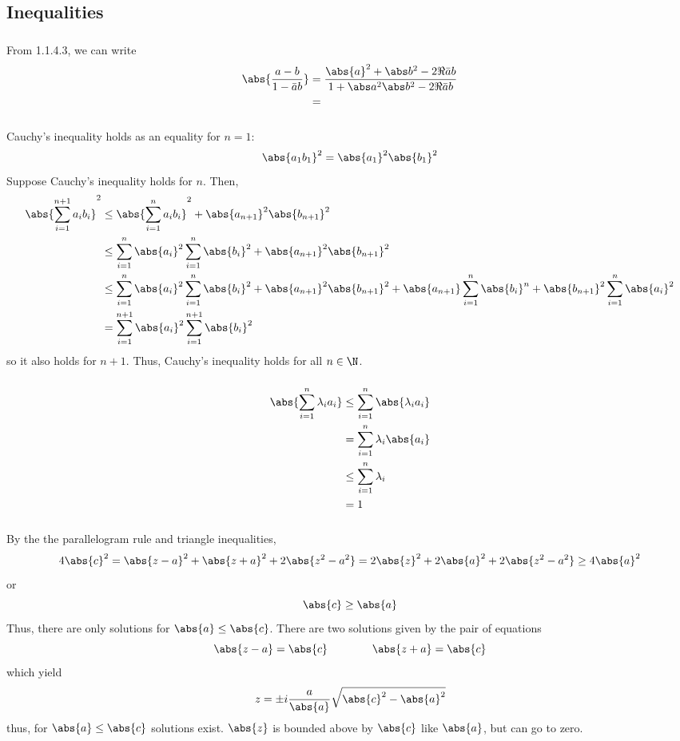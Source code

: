 \subsection{Inequalities}
\subsubsection{}
From 1.1.4.3, we can write
\begin{align*}
	\abs{\frac{a-b}{1-\bar a b}}&=\frac{\abs{a}^2 + \abs b^2 - 2\Re\bar a b}{1+\abs a ^2 \abs b ^2 - 2\Re\bar a b}\\
				    &=
\end{align*}
\subsubsection{}
Cauchy's inequality holds as an equality for \(n=1\):
\[\abs{a_1b_1}^2=\abs{a_1}^2\abs{b_1}^2\]
Suppose Cauchy's inequality holds for \(n\). Then,
\begin{align*}
	\abs{\sum_{i=1}^{n+1} a_ib_i}^2&\leq \abs{\sum_{i=1}^n a_ib_i}^2+\abs{a_{n+1}}^2\abs{b_{n+1}}^2\\
				       &\leq \sum_{i=1}^{n}\abs{a_i}^2\sum_{i=1}^{n}\abs{b_i}^2+\abs{a_{n+1}}^2\abs{b_{n+1}}^2\\
				       &\leq \sum_{i=1}^{n}\abs{a_i}^2\sum_{i=1}^{n}\abs{b_i}^2+\abs{a_{n+1}}^2\abs{b_{n+1}}^2+\abs{a_{n+1}}\sum_{i=1}^{n}\abs{b_i}^n + \abs{b_{n+1}}^2\sum_{i=1}^n\abs{a_i}^2\\
				       &=\sum_{i=1}^{n+1}\abs{a_i}^2\sum_{i=1}^{n+1}\abs{b_i}^2
\end{align*}
so it also holds for \(n+1\). Thus, Cauchy's inequality holds for all \(n\in \N\).
\subsubsection{}
\begin{align*}
	\abs{\sum_{i=1}^n\lambda_ia_i}&\leq\sum_{i=1}^n\abs{\lambda_ia_i}\\
				      &=\sum_{i=1}^n\lambda_{i}\abs{a_i}\\
				      &\leq\sum_{i=1}^n\lambda_i\\
				      &=1
\end{align*}
\subsubsection{}
By the the parallelogram rule and triangle inequalities,
\[4\abs{c}^2 = \abs{z-a}^2+\abs{z+a}^2+2\abs{z^2-a^2} = 2\abs{z}^2+2\abs{a}^2+2\abs{z^2-a^2}\geq  4\abs{a}^2\]
or
\[\abs{c}\geq \abs{a}\]
Thus, there are only solutions for \(\abs{a}\leq \abs{c}\). There are two solutions given by the pair of equations 
\[\abs{z-a}=\abs{c}\qquad\qquad \abs{z+a}=\abs{c}\]
which yield
\[z = \pm i \frac{a}{\abs{a}}\sqrt{\abs{{c}}^2-\abs{a}^2}\]
thus, for \(\abs{a}\leq\abs{c}\) solutions exist. \(\abs{z}\) is bounded above by \(\abs{c}\) like \(\abs{a}\), but can go to zero.

